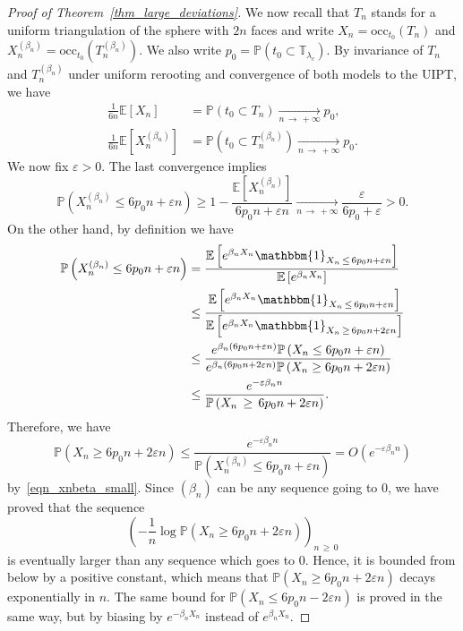 \documentclass[10pt]{amsart}
\theoremstyle{definition}\newtheorem{defi}[theo]{Definition}\newtheorem{rema}[theo]{Remark}\newtheorem{exam}[theo]{Example}\newtheorem{exem}[theo]{Example}\newtheorem{nota}[theo]{Notation}
\newcommand{\eps}{\varepsilon}
\newcommand{\TT}{\mathbb{T}}
\newcommand{\E}{\mathbb{E}}
\renewcommand{\P}{\mathbb{P}}
\newcommand{\occ}{\mathrm{occ}}
\newcommand{\bbmun}{\mathbbm{1}}
\begin{document}
\begin{proof}[Proof of Theorem~\ref{thm_large_deviations}]
We now recall that $T_n$ stands for a uniform triangulation of the sphere with $2n$ faces and write $X_n=\occ_{t_0}(T_n)$ and $X_n^{(\beta_n)}=\occ_{t_0}(T_n^{(\beta_n)})$. We also write $p_0=\P (t_0 \subset \TT_{\lambda_c} )$. By invariance of $T_n$ and $T_n^{(\beta_n)}$ under uniform rerooting and convergence of both models to the UIPT, we have
\begin{align*}
\frac{1}{6n} \E \left[X_n \right] &= \P \left(t_0 \subset T_n \right) \xrightarrow[n\,\to\,+\infty]{} p_0,
\\
\frac{1}{6n} \E \left[X_n^{(\beta_n)} \right] &= \P \left(t_0 \subset T_n^{(\beta_n)} \right) \xrightarrow[n\,\to\,+\infty]{} p_0.
\end{align*}
We now fix $\eps>0$. The last convergence implies
\begin{equation}\label{eqn_xnbeta_small}
\P \left(X_n^{(\beta_n)} \leq 6 p_0 n + \eps n \right) \geq 1-\frac{\E \left[X_n^{(\beta_n)} \right]}{6p_0 n+\eps n} \xrightarrow[n\,\to\,
+\infty]{} \frac{\eps}{6p_0+\eps} >0.
\end{equation}
On the other hand, by definition we have
\begin{align*}
\P \left(X_n^{(\beta_n)} \leq 6 p_0 n + \eps n \right) &= \frac{\E \left[e^{\beta_n X_n} \bbmun_{X_n\,\leq\,6 p_0 n + \eps n} \right]}{\E \left[e^{\beta_n X_n} \right]}\\
& \leq \frac{\E \left[e^{\beta_n X_n} \bbmun_{X_n \,\leq\,6 p_0 n + \eps n} \right]}{\E \left[e^{\beta_n X_n} \bbmun_{X_n\,\geq\,6 p_0 n + 2 \eps n} \right]}\\
& \leq \frac{e^{\beta_n\left(6p_0n+\eps n\right)} \P \left(X_n \leq 6p_0n+\eps n \right)}{e^{\beta_n\left(6p_0n+2\eps n\right)} \P \left(X_n \geq 6p_0n+2\eps n \right)}\\
& \leq \frac{e^{-\eps \beta_n n}}{\P \left(X_n\, \geq\,6p_0n+2\eps n \right)}.
\end{align*}
Therefore, we have
\[
\P \left(X_n \geq 6p_0n+2\eps n \right) \leq \frac{e^{-\eps \beta_n n}}{\P \left(X_n^{(\beta_n)} \leq 6 p_0 n + \eps n \right)} = O \left(e^{-\eps \beta_n n} \right)
\]
by~\eqref{eqn_xnbeta_small}. Since $(\beta_n)$ can be any sequence going to $0$, we have proved that the sequence
\[
\left(-\frac{1}{n} \log \P \left(X_n \geq 6p_0n+2\eps n \right) \right)_{n\,\geq\,0}
\]
is eventually larger than any sequence which goes to $0$. Hence, it is bounded from below by a positive constant, which means that $\P (X_n \geq 6p_0n+2\eps n)$ decays exponentially in $n$. The same bound for $\P (X_n \leq 6p_0n-2\eps n)$ is proved in the same way, but by biasing by $e^{-\beta_n X_n}$ instead of $e^{\beta_n X_n}$.
\end{proof}
\end{document}
